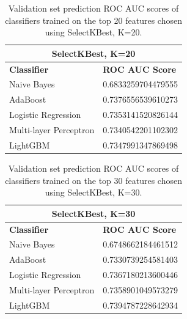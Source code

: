 \documentclass[12pt, letterpaper]{article}
\begin{document}
\begin{table}[h!]
  \centering
  {
  \begin{tabular}{|| l | l ||}
   \hline
   \multicolumn{2}{|c|}{SelectKBest, K=20} \\
   \hline
   \rowcolor{white} \textbf{Classifier} & \textbf{ROC AUC Score} \\ [0.5ex]
   \hline\hline
   Naive Bayes & 0.6833259704479555 \\
   \hline
   AdaBoost & 0.7376556539610273 \\
   \hline
   Logistic Regression & 0.7353141520826144 \\
   \hline
   Multi-layer Perceptron & 0.7340542201102302 \\
   \hline
   LightGBM & 0.7347991347869498 \\ [1ex]
   \hline
  \end{tabular}
 }
 \caption{Validation set prediction ROC AUC scores of classifiers trained on the top 20 features chosen using SelectKBest, K=20.}
 \label{table:3}
\end{table}

\begin{table}[h!]
  \centering
  {
  \begin{tabular}{|| l | l ||}
   \hline
   \multicolumn{2}{|c|}{SelectKBest, K=30} \\
   \hline
   \rowcolor{white} \textbf{Classifier} & \textbf{ROC AUC Score} \\ [0.5ex]
   \hline\hline
   Naive Bayes & 0.6748662184461512 \\
   \hline
   AdaBoost & 0.7330739254581403 \\
   \hline
   Logistic Regression & 0.7367180213600446 \\
   \hline
   Multi-layer Perceptron & 0.7358901049573279 \\
   \hline
   LightGBM & 0.7394787228642934 \\ [1ex]
   \hline
  \end{tabular}
 }
 \caption{Validation set prediction ROC AUC scores of classifiers trained on the top 30 features chosen using SelectKBest, K=30.}
 \label{table:4}
\end{table}

\pagebreak
\end{document}
